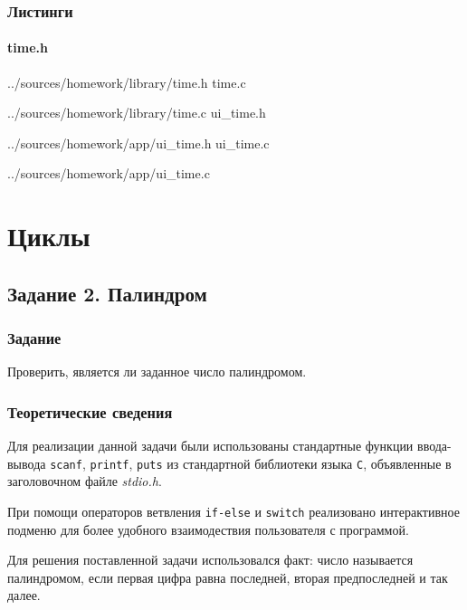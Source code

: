 \documentclass[12pt,a4paper]{report}
\begin{document}
\subsection{Листинги}
\subsubsection*{time.h}

{../sources/homework/library/time.h}
time.c

{../sources/homework/library/time.c}
ui\_time.h

{../sources/homework/app/ui_time.h}
ui\_time.c

{../sources/homework/app/ui_time.c}



\newpage



\chapter{Циклы}
\section{Задание 2. Палиндром}
\subsection{Задание}

\hspace{\parindent}Проверить, является ли заданное число палиндромом.

\subsection{Теоретические сведения}
\hspace{\parindent}Для реализации данной задачи были использованы стандартные функции ввода-вывода \texttt{scanf}, \texttt{printf}, \texttt{puts} из стандартной библиотеки языка \verb+С+, объявленные в заголовочном файле \textit{stdio.h}.

При помощи операторов ветвления \texttt{if-else} и \texttt{switch} реализовано интерактивное подменю для более удобного взаимодествия пользователя с программой.

Для решения поставленной задачи использовался факт: число называется палиндромом, если первая цифра равна последней, вторая предпоследней и так далее.
\end{document}
